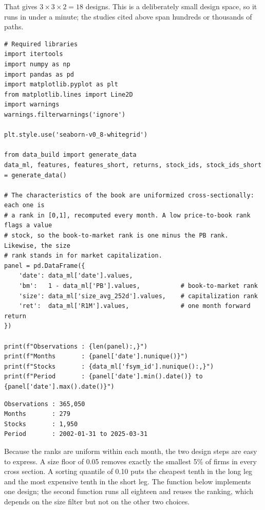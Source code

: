 That gives $3 \times 3 \times 2 = 18$ designs. This is a deliberately small design space, so it runs in under a minute; the studies cited above span hundreds or thousands of paths.

\begin{verbatim}
# Required libraries
import itertools
import numpy as np
import pandas as pd
import matplotlib.pyplot as plt
from matplotlib.lines import Line2D
import warnings
warnings.filterwarnings('ignore')

plt.style.use('seaborn-v0_8-whitegrid')

from data_build import generate_data
data_ml, features, features_short, returns, stock_ids, stock_ids_short = generate_data()

# The characteristics of the book are uniformized cross-sectionally: each one is
# a rank in [0,1], recomputed every month. A low price-to-book rank flags a value
# stock, so the book-to-market rank is one minus the PB rank. Likewise, the size
# rank stands in for market capitalization.
panel = pd.DataFrame({
    'date': data_ml['date'].values,
    'bm':   1 - data_ml['PB'].values,           # book-to-market rank
    'size': data_ml['size_avg_252d'].values,    # capitalization rank
    'ret':  data_ml['R1M'].values,              # one month forward return
})

print(f"Observations : {len(panel):,}")
print(f"Months       : {panel['date'].nunique()}")
print(f"Stocks       : {data_ml['fsym_id'].nunique():,}")
print(f"Period       : {panel['date'].min().date()} to {panel['date'].max().date()}")
\end{verbatim}

\begin{verbatim}
Observations : 365,050
Months       : 279
Stocks       : 1,950
Period       : 2002-01-31 to 2025-03-31
\end{verbatim}

Because the ranks are uniform within each month, the two design steps are easy to express. A size floor of 0.05 removes exactly the smallest 5\% of firms in every cross section. A sorting quantile of 0.10 puts the cheapest tenth in the long leg and the most expensive tenth in the short leg. The function below implements one design; the second function runs all eighteen and reuses the ranking, which depends on the size filter but not on the other two choices.

